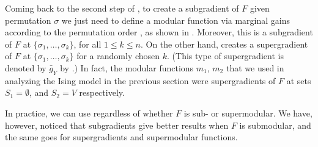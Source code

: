 Coming back to the second step of , to create a subgradient of $F$ given permutation $\sigma$ we just need to define a modular function via marginal gains according to the permutation order \citep{iyer13}, as shown in .
Moreover, this is a subgradient of $F$ at $\{\sigma_1, \ldots, \sigma_k\}$, for all $1 \leq k \leq n$.
On the other hand,  creates a supergradient of $F$ at $\{\sigma_1, \ldots, \sigma_k\}$ for a randomly chosen $k$. (This type of supergradient is denoted by $\bar{g}_Y$ by \cite{iyer13}.)
In fact, the modular functions $m_1$, $m_2$ that we used in analyzing the Ising model in the previous section were supergradients of $F$ at sets $S_1 = \emptyset$, and $S_2 = V$ respectively.

\begin{algorithm}[tb]
  \DontPrintSemicolon
  \caption{\strut Subgradient computation}
  \label{alg:sub}
  \vspace{0.5em}
  \SetKwInOut{Input}{Input}
  \Input{Set function $F$, permutation $\sigma$}
  $A$ $\gets$ $\emptyset$\;
  $f$ $\gets$ $F(\emptyset)$\;
  \For{$v = 1$ \KwTo $n$}{
    $m_v$ $\gets$ $F(A \cup \{\sigma_v\}) - F(A)$\;
    $A$ $\gets$ $A \cup \sigma_v$\;
  }
  \Return{$m(S) \defeq \sum_{v \in S} m_v$}\;%
\end{algorithm}


In practice, we can use  regardless of whether $F$ is sub- or supermodular.
We have, however, noticed that subgradients give better results when $F$ is submodular, and the same goes for supergradients and supermodular functions.

